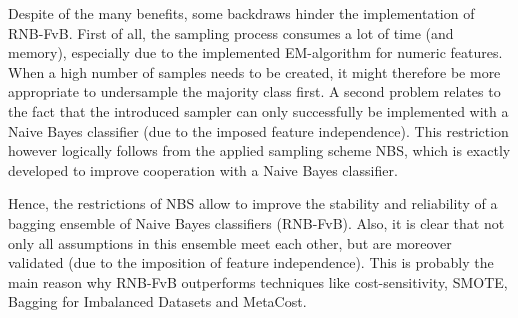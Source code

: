 Despite of the many benefits, some backdraws hinder the implementation of RNB-FvB. First of all, the sampling process consumes a lot of time (and memory), especially due to the implemented EM-algorithm for numeric features. When a high number of samples needs to be created, it might therefore be more appropriate to undersample the majority class first. A second problem relates to the fact that the introduced sampler can only successfully be implemented with a Naive Bayes classifier (due to the imposed feature independence). This restriction however logically follows from the applied sampling scheme NBS, which is exactly developed to improve cooperation with a Naive Bayes classifier. 

Hence, the restrictions of NBS allow to improve the stability and reliability of a bagging ensemble of Naive Bayes classifiers (RNB-FvB). Also, it is clear that not only all assumptions in this ensemble meet each other, but are moreover validated (due to the imposition of feature independence). This is probably the main reason why RNB-FvB outperforms techniques like cost-sensitivity, SMOTE, Bagging for Imbalanced Datasets and MetaCost.





